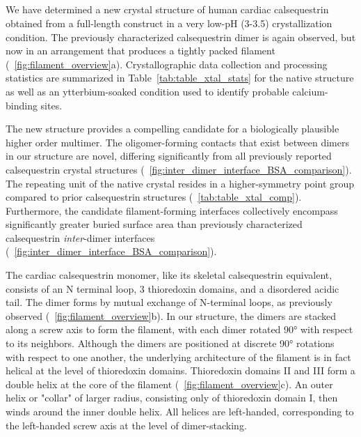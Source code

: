 \subsection{\headingsubsectiontwo}

We have determined a new crystal structure of human cardiac calsequestrin obtained from a full-length construct in a very low-pH (3-3.5) crystallization condition. The previously characterized calsequestrin dimer is again observed, but now in an arrangement that produces a tightly packed filament (\maintextfigure~\ref{fig:filament_overview}a). Crystallographic data collection and processing statistics are summarized in Table~\ref{tab:table_xtal_stats} for the native structure as well as an ytterbium-soaked condition used to identify probable calcium-binding sites. %

The new structure provides a compelling candidate for a biologically plausible higher order multimer. The oligomer-forming contacts that exist between dimers in our structure are novel, differing significantly from all previously reported calsequestrin crystal structures (\extendeddatafigure~\ref{fig:inter_dimer_interface_BSA_comparison}). The repeating unit of the native crystal resides in a higher-symmetry point group compared to prior calsequestrin structures (\supplementarytable~\ref{tab:table_xtal_comp}). Furthermore, the candidate filament-forming interfaces collectively encompass significantly greater buried surface area than previously characterized calsequestrin \textit{inter}-dimer interfaces (\extendeddatafigure~\ref{fig:inter_dimer_interface_BSA_comparison}). 
 
The cardiac calsequestrin monomer, like its skeletal calsequestrin equivalent, consists of an N terminal loop, 3 thioredoxin domains, and a disordered acidic tail. The dimer forms by mutual exchange of N-terminal loops, as previously observed (\maintextfigure~\ref{fig:filament_overview}b). In our structure, the dimers are stacked along a screw axis to form the filament, with each dimer rotated \ang{90} with respect to its neighbors. Although the dimers are positioned at discrete \ang{90} rotations with respect to one another, the underlying architecture of the filament is in fact helical at the level of thioredoxin domains. Thioredoxin domains II and III form a double helix at the core of the filament (\maintextfigure~\ref{fig:filament_overview}c). An outer helix or "collar" of larger radius, consisting only of thioredoxin domain I, then winds around the inner double helix. All helices are left-handed, corresponding to the left-handed screw axis at the level of dimer-stacking. 

